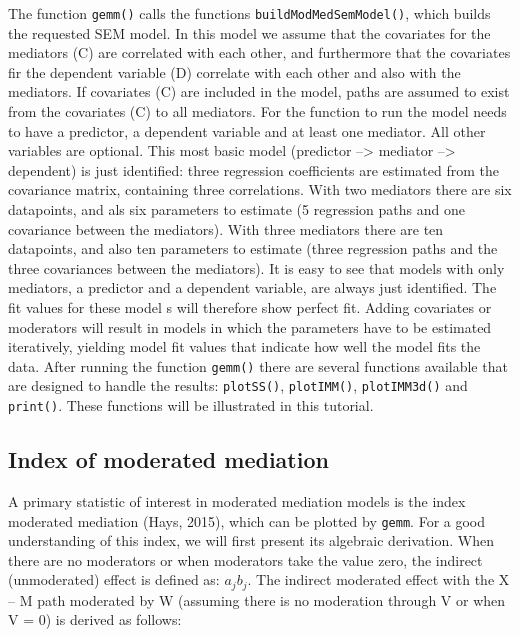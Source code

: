 \documentclass[man,floatsintext]{apa6}
\theoremstyle{definition}
\theoremstyle{definition}
\theoremstyle{definition}
\theoremstyle{remark}
\begin{document}
The function \texttt{gemm()} calls the functions
\texttt{buildModMedSemModel()}, which builds the requested SEM model. In
this model we assume that the covariates for the mediators (C) are
correlated with each other, and furthermore that the covariates fir the
dependent variable (D) correlate with each other and also with the
mediators. If covariates (C) are included in the model, paths are
assumed to exist from the covariates (C) to all mediators. For the
function to run the model needs to have a predictor, a dependent
variable and at least one mediator. All other variables are optional.
This most basic model (predictor --\textgreater{} mediator
--\textgreater{} dependent) is just identified: three regression
coefficients are estimated from the covariance matrix, containing three
correlations. With two mediators there are six datapoints, and als six
parameters to estimate (5 regression paths and one covariance between
the mediators). With three mediators there are ten datapoints, and also
ten parameters to estimate (three regression paths and the three
covariances between the mediators). It is easy to see that models with
only mediators, a predictor and a dependent variable, are always just
identified. The fit values for these model s will therefore show perfect
fit. Adding covariates or moderators will result in models in which the
parameters have to be estimated iteratively, yielding model fit values
that indicate how well the model fits the data. After running the
function \texttt{gemm()} there are several functions available that are
designed to handle the results: \texttt{plotSS()}, \texttt{plotIMM()},
\texttt{plotIMM3d()} and \texttt{print()}. These functions will be
illustrated in this tutorial.

\subsection{Index of moderated
mediation}\label{index-of-moderated-mediation}

A primary statistic of interest in moderated mediation models is the
index moderated mediation (Hays, 2015), which can be plotted by
\texttt{gemm}. For a good understanding of this index, we will first
present its algebraic derivation. When there are no moderators or when
moderators take the value zero, the indirect (unmoderated) effect is
defined as: \(a_j b_j\). The indirect moderated effect with the X -- M
path moderated by W (assuming there is no moderation through V or when V
= 0) is derived as follows:
\end{document}
